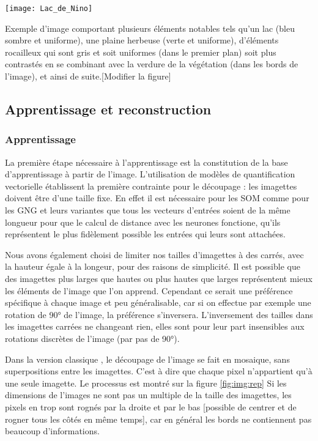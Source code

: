 	\begin{figureth}
		\texttt{[image: Lac\_de\_Nino]}
		\caption[Lac de Nino]{Exemple d'image comportant plusieurs éléments notables tels qu'un lac (bleu sombre et uniforme), une plaine herbeuse (verte et uniforme), d'éléments rocailleux qui sont gris et soit uniformes (dans le premier plan) soit plus contrastés en se combinant avec la verdure de la végétation (dans les bords de l'image), et ainsi de suite.[Modifier la figure]}\label{fig:img:nino}
	\end{figureth}

	\subsection{Apprentissage et reconstruction}\label{sec:img:compression}
	\subsubsection{Apprentissage}
	La première étape nécessaire à l'apprentissage est la constitution de la base d'apprentissage à partir de l'image. L'utilisation de modèles de quantification vectorielle établissent la première contrainte pour le découpage : les imagettes doivent être d'une taille fixe. En effet il est nécessaire pour les SOM comme pour les GNG et leurs variantes que tous les vecteurs d'entrées soient de la même longueur pour que le calcul de distance avec les neurones fonctione, qu'ils représentent le plus fidèlement possible les entrées qui leurs sont attachées.

	Nous avons également choisi de limiter nos tailles d'imagettes à des carrés, avec la hauteur égale à la longeur, pour des raisons de simplicité. Il est possible que des imagettes plus larges que hautes ou plus hautes que larges représentent mieux les éléments de l'image que l'on apprend. Cependant ce serait une préférence spécifique à chaque image et peu généralisable, car si on effectue par exemple une rotation de 90° de l'image, la préférence s'inversera. L'inversement des tailles dans les imagettes carrées ne changeant rien, elles sont pour leur part insensibles aux rotations discrètes de l'image (par pas de 90°).

	Dans la version classique \cite{amerijckx-compression}, le découpage de l'image se fait en mosaique, sans superpositions entre les imagettes. C'est à dire que chaque pixel n'appartient qu'à une seule imagette. Le processus est montré sur la figure \ref{fig:img:rep} Si les dimensions de l'images ne sont pas un multiple de la taille des imagettes, les pixels en trop sont rognés par la droite et par le bas [possible de centrer et de rogner tous les côtés en même temps], car en général les bords ne contiennent pas beaucoup d'informations.

